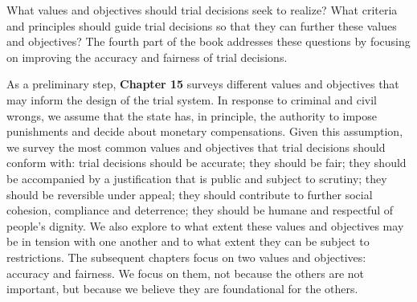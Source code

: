 \documentclass[
  10pt,
  dvipsnames,enabledeprecatedfontcommands]{scrartcl}
\begin{document}
\noindent What values and objectives should trial decisions seek to
realize? What criteria and principles should guide trial decisions so
that they can further these values and objectives? The fourth part of
the book addresses these questions by focusing on improving the accuracy
and fairness of trial decisions.

As a preliminary step, \textbf{Chapter 15} surveys different values and
objectives that may inform the design of the trial system. In response
to criminal and civil wrongs, we assume that the state has, in
principle, the authority to impose punishments and decide about monetary
compensations. Given this assumption, we survey the most common values
and objectives that trial decisions should conform with: trial decisions
should be accurate; they should be fair; they should be accompanied by a
justification that is public and subject to scrutiny; they should be
reversible under appeal; they should contribute to further social
cohesion, compliance and deterrence; they should be humane and
respectful of people's dignity. We also explore to what extent these
values and objectives may be in tension with one another and to what
extent they can be subject to restrictions. The subsequent chapters
focus on two values and objectives: accuracy and fairness. We focus on
them, not because the others are not important, but because we believe
they are foundational for the others.
\end{document}
